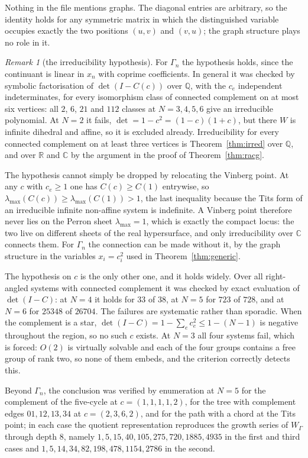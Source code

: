 \documentclass[11pt]{article}
\theoremstyle{definition}
\theoremstyle{remark}
\newtheorem{remark}[theorem]{Remark}
\theoremstyle{definition}
\newcommand{\Q}{\mathbb{Q}}
\newcommand{\R}{\mathbb{R}}
\newcommand{\C}{\mathbb{C}}
\begin{document}
Nothing in the file mentions graphs. The diagonal entries are arbitrary, so the identity holds for
any symmetric matrix in which the distinguished variable occupies exactly the two positions
$(u,v)$ and $(v,u)$; the graph structure plays no role in it.

\begin{remark}[the irreducibility hypothesis]\label{rem:irred}
For $\Gamma_n$ the hypothesis holds, since the continuant is linear in $x_n$ with coprime
coefficients. In general it was checked by symbolic factorisation of $\det(I-C(c))$ over
$\mathbb{Q}$, with the $c_e$ independent indeterminates, for every isomorphism class of connected
complement on at most six vertices: all $2$, $6$, $21$ and $112$ classes at $N=3,4,5,6$ give an
irreducible polynomial. At $N=2$ it fails, $\det=1-c^2=(1-c)(1+c)$, but there $W$ is infinite
dihedral and affine, so it is excluded already. Irreducibility for every connected complement on
at least three vertices is Theorem~\ref{thm:irred} over $\Q$, and over $\R$ and $\C$ by the
argument in the proof of Theorem~\ref{thm:racg}.

The hypothesis cannot simply be dropped by relocating the Vinberg point. At any $c$ with
$c_e\ge1$ one has $C(c)\ge C(1)$ entrywise, so $\lambda_{\max}(C(c))\ge\lambda_{\max}(C(1))>1$,
the last inequality because the Tits form of an irreducible infinite non-affine system is
indefinite. A Vinberg point therefore never lies on the Perron sheet $\lambda_{\max}=1$, which is
exactly the compact locus: the two live on different sheets of the real hypersurface, and only
irreducibility over $\mathbb{C}$ connects them. For $\Gamma_n$ the connection can be made without
it, by the graph structure in the variables $x_i=c_i^2$ used in Theorem~\ref{thm:generic}.
\end{remark}

The hypothesis on $c$ is the only other one, and it holds widely. Over all right-angled systems with
connected complement it was checked by exact evaluation of $\det(I-C)$: at $N=4$ it holds for $33$
of $38$, at $N=5$ for $723$ of $728$, and at $N=6$ for $25348$ of $26704$. The failures are
systematic rather than sporadic. When the complement is a star, $\det(I-C)=1-\sum_ec_e^2\le1-(N-1)$
is negative throughout the region, so no such $c$ exists. At $N=3$ all four systems fail, which is
forced: $O(2)$ is virtually solvable and each of the four groups contains a free group of rank two,
so none of them embeds, and the criterion correctly detects this.

Beyond $\Gamma_n$, the conclusion was verified by enumeration at $N=5$ for the complement of the
five-cycle at $c=(1,1,1,1,2)$, for the tree with complement edges $01,12,13,34$ at $c=(2,3,6,2)$,
and for the path with a chord at the Tits point; in each case the quotient representation
reproduces the growth series of $W_\Gamma$ through depth $8$, namely
$1,5,15,40,105,275,720,1885,4935$ in the first and third cases and
$1,5,14,34,82,198,478,1154,2786$ in the second.
\end{document}
